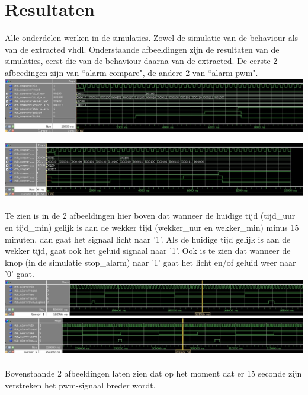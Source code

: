 \section{Resultaten}
Alle onderdelen werken in de simulaties. Zowel de simulatie van de behaviour als van de extracted vhdl.
Onderstaande afbeeldingen zijn de resultaten van de simulaties, eerst die van de behaviour daarna van de extracted.
De eerste 2 afbeedingen zijn van ``alarm-compare", de andere 2 van ``alarm-pwm".
\\

\includegraphics[width=\textwidth,height=\textheight,keepaspectratio]{Figuren/Alarm/Compare_beh.jpg}

\includegraphics[width=\textwidth,height=\textheight,keepaspectratio]{Figuren/Alarm/Compare_ext.jpg}
\\
\\
Te zien is in de 2 afbeeldingen hier boven dat wanneer de huidige tijd (tijd\_uur en tijd\_min) gelijk is aan de wekker tijd (wekker\_uur en wekker\_min) minus 15 minuten, dan gaat het signaal licht naar '1'. Als de huidige tijd gelijk is aan de wekker tijd, gaat ook het geluid signaal naar '1'.
Ook is te zien dat wanneer de knop (in de simulatie stop\_alarm) naar '1' gaat het licht en/of geluid weer naar '0' gaat.
\\

\includegraphics[width=\textwidth,height=\textheight,keepaspectratio]{Figuren/Alarm/Alarm_beh.jpg}
\\

\includegraphics[width=\textwidth,height=\textheight,keepaspectratio]{Figuren/Alarm/Alarm_ext.jpg}
\\
\\
Bovenstaande 2 afbeeldingen laten zien dat op het moment dat er 15 seconde zijn verstreken het pwm-signaal breder wordt.

